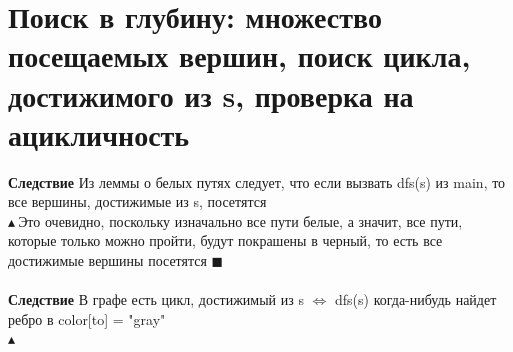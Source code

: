 \setcounter{section}{27}
\section{Поиск в глубину: множество посещаемых вершин, поиск цикла, достижимого из s, проверка на
ацикличность}
\textbf{Следствие} Из леммы о белых путях следует, что если вызвать dfs(s) из main, то все вершины, достижимые из s, посетятся
\\
$\blacktriangle \ $Это очевидно, поскольку изначально все пути белые, а значит, все пути, которые только можно пройти, будут покрашены в черный, то есть все достижимые вершины посетятся $\blacksquare$
\\
\\
\textbf{Следствие} В графе есть цикл, достижимый из s $\Longleftrightarrow$ dfs(s) когда-нибудь найдет ребро в color[to] = "gray"
\\
$\blacktriangle \;$
